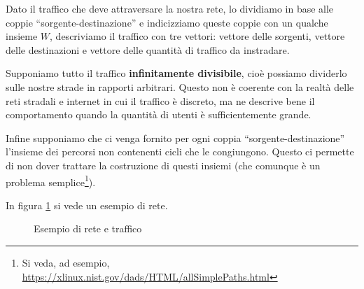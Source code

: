 \documentclass[a4paper]{article}
\theoremstyle{plain}
\theoremstyle{definition}
\theoremstyle{remark}
\begin{document}
Dato il traffico che deve attraversare la nostra rete, lo dividiamo in
base alle coppie ``sorgente-destinazione'' e indicizziamo queste
coppie con un qualche insieme $W$, descriviamo il traffico con tre
vettori: vettore delle sorgenti, vettore delle destinazioni e vettore
delle quantità di traffico da instradare.

Supponiamo tutto il traffico \textbf{infinitamente divisibile}, cioè
possiamo dividerlo sulle nostre strade in rapporti arbitrari. Questo
non è coerente con la realtà delle reti stradali e internet in cui il
traffico è discreto, ma ne descrive bene il comportamento quando la
quantità di utenti è sufficientemente grande.

Infine supponiamo che ci venga fornito per ogni coppia
``sorgente-destinazione'' l'insieme dei percorsi non contenenti cicli
che le congiungono. Questo ci permette di non dover trattare la
costruzione di questi insiemi (che comunque è un problema
semplice\footnote{Si veda, ad esempio,
  \url{https://xlinux.nist.gov/dads/HTML/allSimplePaths.html}}).

In figura \ref{fig:esempio-rete} si vede un esempio di rete.

\begin{figure}[ht]
  \centering
  \caption{Esempio di rete e traffico}
  \label{fig:esempio-rete}
\end{figure}
\end{document}
